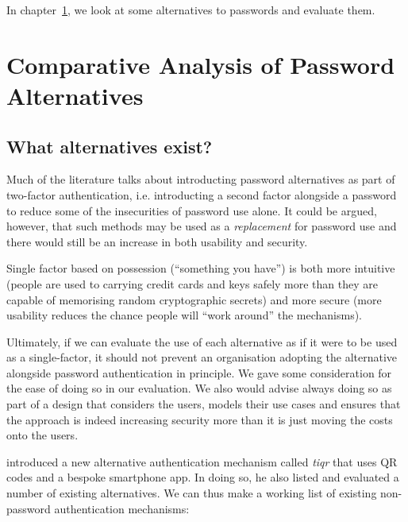 \documentclass{report}
\begin{document}
In chapter~\ref{chapter:alternatives}, we look at some alternatives to passwords
and evaluate them.

\chapter{Comparative Analysis of Password Alternatives}
\label{chapter:alternatives}

\section{What alternatives exist?}

Much of the literature talks about introducting password alternatives
as part of two-factor authentication, i.e. introducting a second factor
alongside a password to reduce some of the insecurities of password use
alone. It could be argued, however, that such methods may be used as
a \emph{replacement} for password use and there would still be an increase
in both usability and security.

Single factor based on possession (``something
you have'') is both more intuitive (people are used to carrying credit cards
and keys safely more than they are capable of memorising random
cryptographic secrets) and more secure (more usability reduces the chance
people will ``work around'' the mechanisms).

Ultimately, if we can evaluate the use of each alternative as if it were
to be used as a single-factor, it should not prevent an organisation
adopting the alternative alongside password authentication in principle. We
gave some consideration for the ease of doing so in our evaluation. We also
would advise always doing so as part of a design that considers the users,
models their use cases and ensures that the approach is indeed increasing
security more than it is just moving the costs onto the users.

\cite{van2011tiqr} introduced a new alternative authentication mechanism
called \emph{tiqr} that uses QR codes and a bespoke smartphone app. In
doing so, he also listed and evaluated a number of existing alternatives. We
can thus make a working list of existing non-password authentication
mechanisms:
\end{document}
